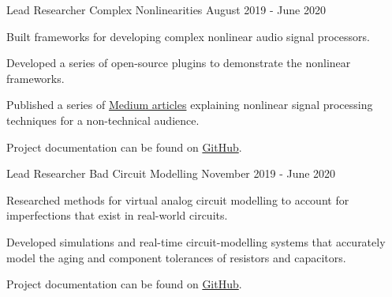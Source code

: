\begin{cventries}
  \cventry
    {Lead Researcher} %
    {Complex Nonlinearities} %
    {} %
    {August 2019 - June 2020} %
    {
      \begin{cvitems} %
        \item {Built frameworks for developing complex nonlinear audio signal processors.}
        \item {Developed a series of open-source plugins to demonstrate the nonlinear frameworks.}
        \item {Published a series of \href{https://medium.com/@jatinchowdhury18/complex-nonlinearities-episode-0-why-4ad9b3eed60f}{Medium articles}
               explaining nonlinear signal processing techniques for a non-technical audience.}
        \item {Project documentation can be found on \href{https://github.com/jatinchowdhury18/ComplexNonlinearities}{GitHub}.}
      \end{cvitems}
    }

  \cventry
    {Lead Researcher} %
    {Bad Circuit Modelling} %
    {} %
    {November 2019 - June 2020} %
    {
        \begin{cvitems}
              \item{Researched methods for virtual analog circuit modelling
                    to account for imperfections that exist in real-world circuits.}
              \item{Developed simulations and real-time circuit-modelling systems that
                    accurately model the aging and component tolerances of resistors and capacitors.}
              \item{Project documentation can be found on \href{https://github.com/jatinchowdhury18/Bad-Circuit-Modelling}{GitHub}.}
        \end{cvitems}
    }


\end{cventries}
